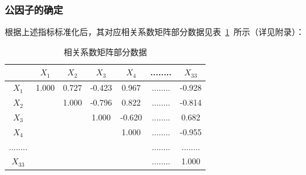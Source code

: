 \documentclass{whutmod}
\begin{document}
\begin{itemize}
	\subsubsection{公因子的确定}
	根据上述指标标准化后，其对应相关系数矩阵部分数据见表~\ref{shuju2}~所示（详见附录）：
	\begin{table}[H]
		 \centering
		\caption{相关系数矩阵部分数据}\label{shuju2}
		\begin{tabular}{ccccccc}
			\toprule[2pt]
			\multicolumn{1}{m{1cm}}{\centering } &
			\multicolumn{1}{m{2cm}}{\centering $X_{1}$} & \multicolumn{1}{m{2cm}}{\centering $X_{2}$} & \multicolumn{1}{m{2cm}}{\centering $X_{3}$}&
			\multicolumn{1}{m{2cm}}{\centering $X_{4}$}&
			\multicolumn{1}{m{1cm}}{\centering ........} &
			\multicolumn{1}{m{2cm}}{\centering $X_{33}$}
			\\
				\midrule[1pt]
			$X_{1}$&1.000	 &  0.727 & -0.423&0.967&........& -0.928\\ 
			$X_{2}$& &  1.000 & -0.796&0.822&........&-0.814\\ 
			$X_{3}$& &   & 1.000&-0.620&........&0.682\\ 
			$X_{4}$& &   & &1.000&........&-0.955\\ 
			........& &   & & &........&........\\ 
			$X_{33}$& &   & & &........&1.000\\
			\bottomrule[2pt]
		\end{tabular}
	\end{table}
	

\end{itemize}
\end{document}
